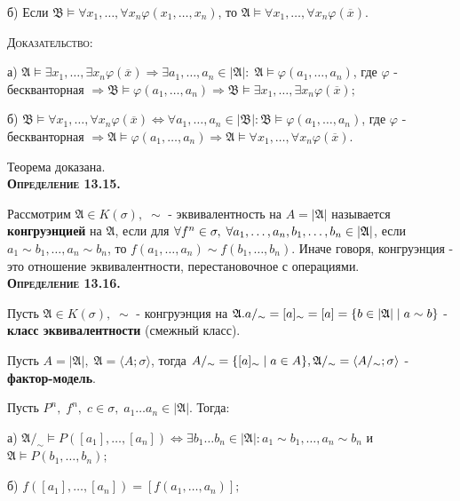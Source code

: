 \documentclass[18pt, a4paper]{extarticle}
\newcommand{\vp}{\varphi}
\newcommand{\vD}{\vDash}
\newcommand{\mA}{\mathfrak{A}}
\newcommand{\mB}{\mathfrak{B}}
\begin{document}
б) Если $\mathfrak{B}\vDash\forall x_1,\dots,\forall x_n\varphi(x_1,\dots,x_n)$, то $\mathfrak{A}\vDash\forall x_1,\dots,\forall x_n\varphi(\overline{x})$.

\textsc{Доказательство:}

а) $\mathfrak{A}\vDash\exists x_1,\dots,\exists x_n\varphi(\overline{x})\Rightarrow\exists a_1,\dots,a_n\in|\mA|:\;\mathfrak{A}\vDash\varphi(a_1,\dots,a_n)$, где $\varphi$ -  бескванторная $\Rightarrow\mathfrak{B}\vDash\varphi(a_1,\dots,a_n)\Rightarrow\mathfrak{B}\vDash\exists x_1,\dots,\exists x_n\varphi(\overline{x});$

б) $\mB\vD\forall x_1,\dots,\forall x_n\vp(\overline{x})\Leftrightarrow\forall a_1,\dots,a_n\in|\mB|:\mB\vD\vp(a_1,\dots,a_n)$, где $\vp$ -  бескванторная $\Rightarrow\mA\vD\vp(a_1,\dots,a_n)\Rightarrow\mA\vD\forall x_1,\dots,\forall x_n\vp(\overline{x})$.

Теорема доказана.\\

\textbf{\textsc{Определение 13.15.}} 

Рассмотрим $\mathfrak{A}\in K(\sigma),\;\sim$ -  эквивалентность на $A=|\mathfrak{A}|$ называется \textbf{конгруэнцией} на $\mathfrak{A}$, если для $\forall f^n\in\sigma,\;\forall a_1,\dots,a_n,\newline b_1,\dots,b_n\in|\mathfrak{A}|$, если $a_1\sim b_1,\dots,a_n\sim b_n$, то $f(a_1,\dots,a_n)\sim f(b_1,\dots,b_n)$. Иначе говоря, конгруэнция - это отношение эквивалентности, перестановочное с операциями.\\

\textbf{\textsc{Определение 13.16.}} 

Пусть $\mathfrak{A}\in K(\sigma),\;\sim$ -  конгруэнция на $\mathfrak{A}.\newline a/_\sim=[a]_\sim=[a]=\{b\in|\mathfrak{A}|\;|\;a\sim b\}$ -  \textbf{класс эквивалентности} (смежный класс). 

Пусть $A=|\mathfrak{A}|,\;\mathfrak{A}=\langle A;\sigma\rangle$, тогда $A/_\sim=\{[a]_\sim\;|\;a\in A\},\;\newline\mathfrak{A}/_\sim=\langle A/_\sim;\sigma\rangle$ -  \textbf{фактор-модель}. 

Пусть $P^n,\;f^n,\;c\in\sigma,\;a_1\dots a_n\in|\mathfrak{A}|$. Тогда:

а) $\mathfrak{A}/_\sim\vDash P([a_1],\dots,[a_n])\Leftrightarrow\exists b_1\dots b_n\in|\mathfrak{A}|\!\!:a_1\sim b_1,\dots,a_n\sim b_n$ и\;\; $\mathfrak{A}\vDash P(b_1,\dots,b_n);$

б) $f([a_1],\dots,[a_n])=[f(a_1,\dots,a_n)];$
\end{document}
